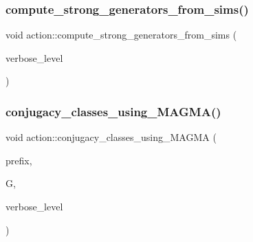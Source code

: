 \mbox{\label{classaction_adb6285ff557ef0f7f832278a4115303f}} 
\subsubsection{\texorpdfstring{compute\+\_\+strong\+\_\+generators\+\_\+from\+\_\+sims()}{compute\_strong\_generators\_from\_sims()}}
{\footnotesize\ttfamily void action\+::compute\+\_\+strong\+\_\+generators\+\_\+from\+\_\+sims (\begin{DoxyParamCaption}\item[{\mbox{\hyperlink{galois_8h_a09fddde158a3a20bd2dcadb609de11dc}{I\+NT}}}]{verbose\+\_\+level }\end{DoxyParamCaption})}

\mbox{\label{classaction_aa3a05eba9459638fe9b7f77a8ddfceb4}} 
\subsubsection{\texorpdfstring{conjugacy\+\_\+classes\+\_\+using\+\_\+\+M\+A\+G\+M\+A()}{conjugacy\_classes\_using\_MAGMA()}}
{\footnotesize\ttfamily void action\+::conjugacy\+\_\+classes\+\_\+using\+\_\+\+M\+A\+G\+MA (\begin{DoxyParamCaption}\item[{const \mbox{\hyperlink{galois_8h_ab6cc7b4aeb6ea31aba2b3fbfc83ff5e6}{B\+Y\+TE}} $\ast$}]{prefix,  }\item[{\mbox{\hyperlink{classsims}{sims}} $\ast$}]{G,  }\item[{\mbox{\hyperlink{galois_8h_a09fddde158a3a20bd2dcadb609de11dc}{I\+NT}}}]{verbose\+\_\+level }\end{DoxyParamCaption})}

\mbox{\label{classaction_a5757c5b9562366be88526cc943c015e0}} 
